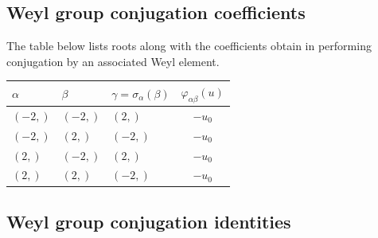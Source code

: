 \documentclass[11pt]{article}
\newcommand{\noi}{\noindent}
\theoremstyle{definition}
\begin{document}
\subsection{Weyl group conjugation coefficients}

The table below lists roots along with the coefficients obtain in performing conjugation by an associated Weyl element.

\bigskip

\noi \noindent \begin{longtable}{|l|l|l|c|}
    \hline
    \textbf{$\alpha$} & \textbf{$\beta$} & \textbf{$\gamma = \sigma_{\alpha}(\beta)$} & $\varphi_{\alpha\beta}(u)$ \\
    \hline
    \endhead
    $\left( -2,\right)$ & $\left( -2,\right)$ & $\left( 2,\right)$ & $- u_{0}$ \\
    \hline
    $\left( -2,\right)$ & $\left( 2,\right)$ & $\left( -2,\right)$ & $- u_{0}$ \\
    \hline
    $\left( 2,\right)$ & $\left( -2,\right)$ & $\left( 2,\right)$ & $- u_{0}$ \\
    \hline
    $\left( 2,\right)$ & $\left( 2,\right)$ & $\left( -2,\right)$ & $- u_{0}$ \\
    \hline
\end{longtable}


\subsection{Weyl group conjugation identities}
\end{document}
